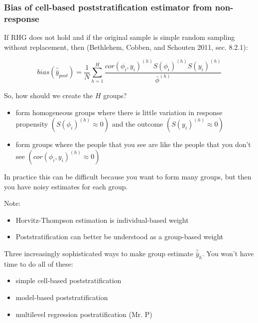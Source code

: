 \documentclass[aspectratio=169]{beamer}
\begin{document}
\begin{frame}
\frametitle{Bias of cell-based poststratification estimator from non-response}

If RHG does not hold and if the original sample is simple random sampling without replacement, then (Bethlehem, Cobben, and Schouten 2011, sec. 8.2.1):

$$bias(\hat{\bar{y}}_{post}) = \frac{1}{N} \sum_{h=1}^H \frac{cor(\phi_i, y_i)^{(h)} S(\phi_i)^{(h)} S(y_i)^{(h)}}{\bar{\phi}^{(h)}}$$

So, how should we create the $H$ groups? \pause
\begin{itemize}
\item form homogeneous groups where there is little variation in response propensity $(S(\phi_i)^{(h)} \approx 0)$ and the outcome $(S(y_i)^{(h)} \approx 0)$ \pause
\item form groups where the people that you see are like the people that you don't see $(cor(\phi_i, y_i)^{(h)} \approx 0)$
\end{itemize}

\vfill
In practice this can be difficult because you want to form many groups, but then you have noisy estimates for each group.

\end{frame}
\begin{frame}

Note:
\begin{itemize}
\item Horvitz-Thompson estimation is individual-based weight
\item Poststratification can better be understood as a group-based weight
\end{itemize}

\end{frame}
\begin{frame}

Three increasingly sophisticated ways to make group estimate $\hat{\bar{y}}_h$.  You won't have time to do all of these:
\begin{itemize}
\item simple cell-based poststratification
\item model-based poststratification
\item multilevel regression postratification (Mr. P)
\end{itemize}

\end{frame}
\end{document}

